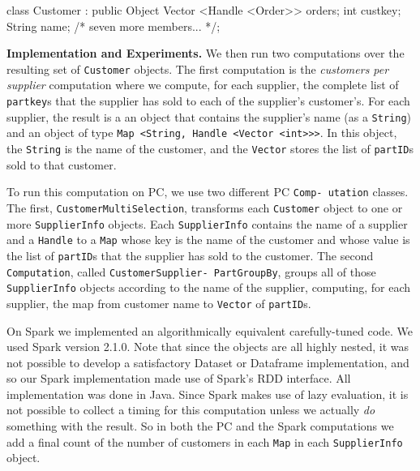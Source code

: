 \begin{codesmall}
class Customer : public Object {
   Vector <Handle <Order>> orders;
   int custkey;
   String name;
   /* seven more members... */};
\end{codesmall}

\vspace{5pt}
\noindent
\textbf{Implementation and Experiments.} We then run two computations over the resulting set of \texttt{Customer} objects.  
The first computation is the \emph{customers per supplier} computation where we
compute, for each supplier,
the complete list of \texttt{partkey}s that the supplier has sold to each of the supplier's customer's.
For each supplier, the result is a an object that contains the supplier's name (as a \texttt{String}) and
an object of type \texttt{Map <String, Handle <Vector <int}\texttt{>}\texttt{>}\texttt{>}.  In this
object, the \texttt{String} is the name of the customer, and the \texttt{Vector} stores the list of
\texttt{partID}s sold to that customer.

To run this computation on PC, we use two different PC \texttt{Comp- utation} classes.  The first, 
\texttt{Customer}\-\texttt{MultiSelection}, transforms each 
\texttt{Customer} object to one or more
\texttt{SupplierInfo} objects. Each \texttt{SupplierInfo} contains
the name of a supplier
and a \texttt{Handle} to a \texttt{Map} whose key is the name of the customer and whose value is the list
of \texttt{partID}s that the supplier has sold to the customer.
The second \texttt{Computation}, called
\texttt{CustomerSupplier- PartGroupBy},
groups all of those \texttt{SupplierInfo} objects according to the name of the supplier, computing, for each
supplier, the map from customer name to \texttt{Vector} of \texttt{partID}s.

On Spark we implemented an algorithmically equivalent
carefully-tuned code.  We used
Spark version
2.1.0.
Note that since the objects are all highly nested, it was not possible to develop a satisfactory
Dataset or Dataframe implementation, and so our Spark implementation made use of Spark's RDD interface.  All
implementation was done in Java.  Since Spark makes use of lazy evaluation, it is not possible to collect a timing
for this computation unless we actually \emph{do} something with the result.  So in both the PC and the Spark computations
we add a final count of the number of customers in each \texttt{Map} in each \texttt{SupplierInfo} object.

